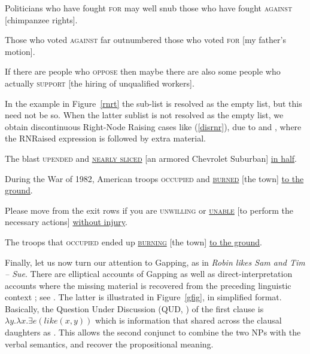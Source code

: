 {\begin{exe}
\begin{xlista}
\ex Politicians who have fought \textsc{for} may well snub those
 who have fought \textsc{against} [chimpanzee rights]. \\
\citep[]{postal94}\addpages

\ex Those who voted \textsc{against} far outnumbered those who
voted  \textsc{for} [my father's motion].\\
\citep[1344]{rodney}


\ex If there are people who \textsc{oppose} then maybe there are also some
  people who actually \textsc{support}  [the hiring of unqualified
  workers].\\
  \citep[]{chavesrnr}

\end{xlista}


\end{exe}




In the example in Figure~\ref{rnrt}  the sub-list  is resolved as the empty list, but this need not be so. When the latter sublist is not resolved as the empty list, we obtain discontinuous Right-Node Raising cases like (\ref{disrnr}), due to  \citet[238--240]{Whitman:09}
and \citet[868]{chavesrnr}, where the RNRaised expression is followed by extra material. 
\begin{exe}
\ex \begin{xlista}
\ex The blast \textsc{upended} and \underline{\textsc{nearly sliced}} [an armored Chevrolet Suburban] \underline{in half}.

\ex During the War of 1982, American troops
\textsc{occupied}  and \underline{\textsc{burned}} [the town] \underline{to the ground}.

\ex Please move from the exit rows if you are \textsc{unwilling} or \underline{\textsc{unable}}
 [to perform the necessary actions] \underline{without injury}.

\ex The troops that \textsc{occupied} ended up \underline{\textsc{burning}}
[the town] \underline{to the ground}.



\end{xlista}\label{disrnr}
\end{exe}



Finally, let us now turn our attention to Gapping, as in 
\emph{Robin likes Sam and Tim -- Sue}.
There are elliptical accounts of Gapping  \citep{chaves06} as well as direct-interpretation accounts where the missing material is recovered from the preceding linguistic context  \citep{Mouret:06,Abeille:Blbie:Mouret:14,sangheepark}; see . The latter is illustrated in Figure~\ref{gfig}, in simplified format. Basically, the Question Under Discussion (QUD, \citealp{roberts96}) of the first clause is $\lambda y.\lambda x. \exists e(like(x,y))$ which is information that shared across the clausal daughters as .
This allows the second conjunct to combine the two NPs with the verbal semantics, and recover the propositional meaning.

}
